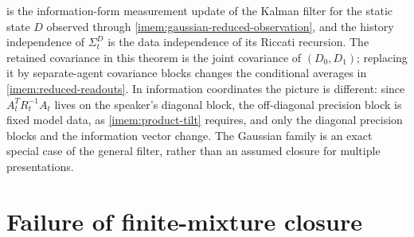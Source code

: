  is the information-form measurement update of the Kalman filter \citep{Kalman1960} for the static state $D$ observed through \cref{imem:gaussian-reduced-observation}, and the history independence of $\Sigma^D_t$ is the data independence of its Riccati recursion. The retained covariance in this theorem is the joint covariance of $(D_0,D_1)$; replacing it by separate-agent covariance blocks changes the conditional averages in \cref{imem:reduced-readouts}. In information coordinates the picture is different: since $A_t^TR_t^{-1}A_t$ lives on the speaker's diagonal block, the off-diagonal precision block is fixed model data, as \cref{imem:product-tilt} requires, and only the diagonal precision blocks and the information vector change. The Gaussian family is an exact special case of the general filter, rather than an assumed closure for multiple presentations.

\section{Failure of finite-mixture closure}

